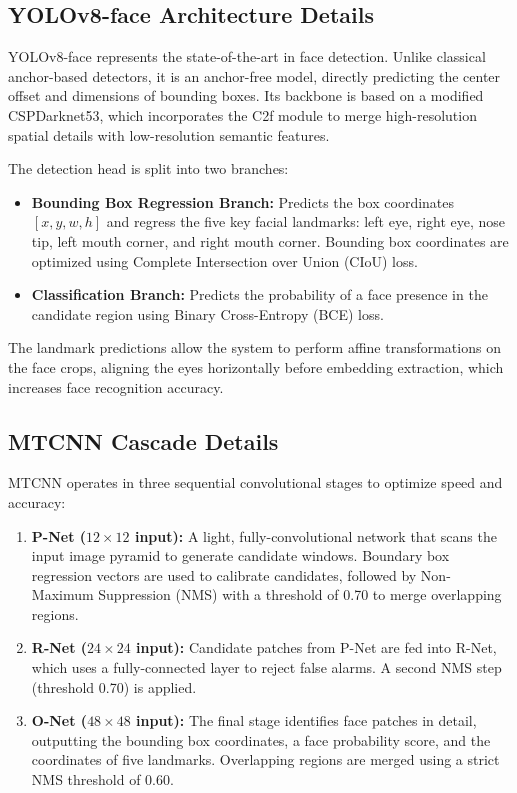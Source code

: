 \subsection{YOLOv8-face Architecture Details}
YOLOv8-face represents the state-of-the-art in face detection. Unlike classical anchor-based detectors, it is an anchor-free model, directly predicting the center offset and dimensions of bounding boxes. Its backbone is based on a modified CSPDarknet53, which incorporates the C2f module to merge high-resolution spatial details with low-resolution semantic features. 

The detection head is split into two branches:
\begin{itemize}
    \item \textbf{Bounding Box Regression Branch:} Predicts the box coordinates $[x, y, w, h]$ and regress the five key facial landmarks: left eye, right eye, nose tip, left mouth corner, and right mouth corner. Bounding box coordinates are optimized using Complete Intersection over Union (CIoU) loss.
    \item \textbf{Classification Branch:} Predicts the probability of a face presence in the candidate region using Binary Cross-Entropy (BCE) loss.
\end{itemize}
The landmark predictions allow the system to perform affine transformations on the face crops, aligning the eyes horizontally before embedding extraction, which increases face recognition accuracy.

\subsection{MTCNN Cascade Details}
MTCNN operates in three sequential convolutional stages to optimize speed and accuracy:
\begin{enumerate}
    \item \textbf{P-Net ($12\times12$ input):} A light, fully-convolutional network that scans the input image pyramid to generate candidate windows. Boundary box regression vectors are used to calibrate candidates, followed by Non-Maximum Suppression (NMS) with a threshold of 0.70 to merge overlapping regions.
    \item \textbf{R-Net ($24\times24$ input):} Candidate patches from P-Net are fed into R-Net, which uses a fully-connected layer to reject false alarms. A second NMS step (threshold 0.70) is applied.
    \item \textbf{O-Net ($48\times48$ input):} The final stage identifies face patches in detail, outputting the bounding box coordinates, a face probability score, and the coordinates of five landmarks. Overlapping regions are merged using a strict NMS threshold of 0.60.
\end{enumerate}


